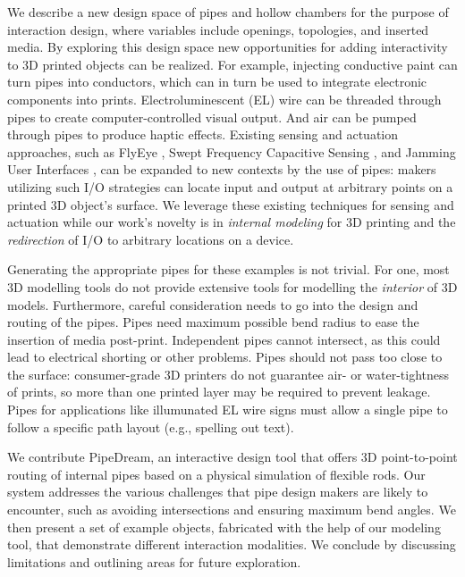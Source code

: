 We describe a new design space of pipes and hollow chambers for the purpose of interaction design, where variables include openings, topologies, and inserted media. By exploring this design space new opportunities for adding interactivity to 3D printed objects can be realized. For example, injecting conductive paint can turn pipes into conductors, which can in turn be used to integrate electronic components into prints. Electroluminescent (EL) wire can be threaded through pipes to create computer-controlled visual output. And air can be pumped through pipes to produce haptic effects.  Existing sensing and actuation approaches, such as FlyEye \cite{Wimmer-flyeye}, Swept Frequency Capacitive Sensing \cite{Sato-touche}, and Jamming User Interfaces \cite{Follmer-jamming}, can be expanded to new contexts by the use of pipes: makers utilizing such I/O strategies can locate input and output at arbitrary points on a printed 3D object's surface.  We leverage these existing techniques for sensing and actuation while our work's novelty is in \emph{internal modeling} for 3D printing and the \emph{redirection} of I/O to arbitrary locations on a device.


Generating the appropriate pipes for these examples is not trivial.  For one, most 3D modelling tools do not provide extensive tools for modelling the  {\em interior} of 3D models. Furthermore, careful consideration needs to go into the design and routing of the pipes. Pipes need maximum possible bend radius to ease the insertion of media post-print.  Independent pipes cannot intersect, as this could lead to electrical shorting or other problems.  Pipes should not pass too close to the surface: consumer-grade 3D printers do not guarantee air- or water-tightness of prints, so more than one printed layer may be required to prevent leakage.  Pipes for applications like illumunated EL wire signs must allow a single pipe to follow a specific path layout (e.g., spelling out text). 

We contribute PipeDream, an interactive design tool that offers 3D point-to-point routing of internal pipes based on a physical simulation of flexible rods. Our system addresses the various challenges that pipe design makers are likely to encounter, such as avoiding intersections and ensuring maximum bend angles. We then present a set of example objects, fabricated with the help of our modeling tool, that demonstrate different interaction modalities. We conclude by discussing limitations and outlining areas for future exploration. 

